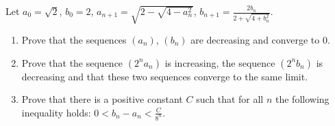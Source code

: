 \documentclass{article}
\begin{document}
\setlength{\parindent}{0pt}
Let $a_{0}=\sqrt{2}$, $b_{0}=2$, $a_{n+1}=\sqrt{2-\sqrt{4-a_{n}^{2}}}$, $b_{n+1}=\frac{2b_{n}}{2+\sqrt{4+b_{n}^{2}}}$.
\begin{enumerate}[label=\alph*)]
\item Prove that the sequences $(a_{n})$, $(b_{n})$ are decreasing and converge to $0$.
\item Prove that the sequence $(2^{n}a_{n})$ is increasing, the sequence $(2^{n}b_{n})$ is decreasing and that these two sequences converge to the same limit.
\item Prove that there is a positive constant $C$ such that for all $n$ the following inequality holds: $0<b_{n}-a_{n}<\frac{C}{8^{n}}$.
\end{enumerate}
\end{document}
